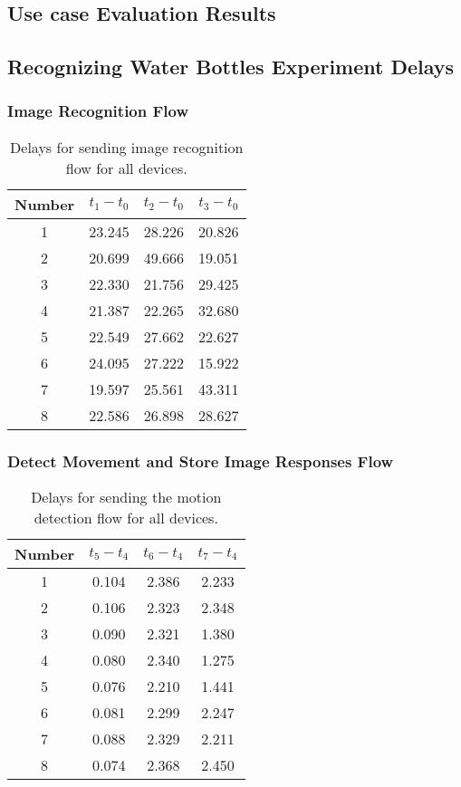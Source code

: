 \begin{appendices}
\chapter{Use case Evaluation Results}

\section{Recognizing Water Bottles Experiment Delays }\label{app:tensor}
\subsection{Image Recognition Flow }
\begin{table}[!ht]
	\centering
\begin{tabular}{ c | c | c| c }	\toprule
Number &$t_1 - t_0$  & $t_2 - t_0$  & $t_3-t_0$ \\ \midrule
1&	23.245&	28.226&	20.826\\
2&	20.699&	49.666&	19.051\\
3&	22.330&	21.756&	29.425\\
4&	21.387&	22.265&	32.680\\
5&	22.549&	27.662&	22.627\\
6&	24.095&	27.222&	15.922\\
7&	19.597&	25.561&	43.311\\
8&	22.586&	26.898&	28.627\\
\end{tabular}
\caption{Delays for sending image recognition flow for all devices.}
\label{table:tensor-results}
\end{table}

\subsection{Detect Movement and Store Image Responses Flow}
\begin{table}[!ht]
	\centering
\begin{tabular}{ c | c | c| c }	\toprule
Number &$t_5 - t_4$  & $t_6 - t_4$  & $t_7-t_4$ \\ \midrule
1&	0.104&	2.386&	2.233\\
2&	0.106&	2.323&	2.348\\
3&	0.090&	2.321&	1.380\\
4&	0.080&	2.340&	1.275\\
5&	0.076& 2.210&	1.441\\
6&	0.081&	2.299&	2.247\\
7& 0.088&	2.329&	2.211\\
8&	0.074&	2.368&	2.450\\
\end{tabular}
\caption{Delays for sending the motion detection flow for all devices.}
\label{table:motion-results}
\end{table}


\end{appendices}
